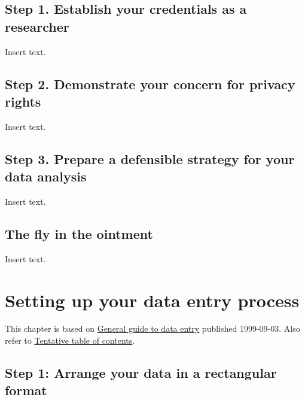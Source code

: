 \documentclass[
  letterpaper,
  DIV=11,
  numbers=noendperiod]{scrreprt}
\begin{document}
\hypertarget{step-1.-establish-your-credentials-as-a-researcher}{%
\section{Step 1. Establish your credentials as a
researcher}\label{step-1.-establish-your-credentials-as-a-researcher}}

Insert text.

\hypertarget{step-2.-demonstrate-your-concern-for-privacy-rights}{%
\section{Step 2. Demonstrate your concern for privacy
rights}\label{step-2.-demonstrate-your-concern-for-privacy-rights}}

Insert text.

\hypertarget{step-3.-prepare-a-defensible-strategy-for-your-data-analysis}{%
\section{Step 3. Prepare a defensible strategy for your data
analysis}\label{step-3.-prepare-a-defensible-strategy-for-your-data-analysis}}

Insert text.

\hypertarget{the-fly-in-the-ointment-5}{%
\section{The fly in the ointment}\label{the-fly-in-the-ointment-5}}

Insert text.


\hypertarget{setting-up-your-data-entry-process}{%
\chapter{Setting up your data entry
process}\label{setting-up-your-data-entry-process}}

This chapter is based on
\href{http://www.pmean.com/99/entry.html}{General guide to data entry}
published 1999-09-03. Also refer to
\href{http://www.pmean.com/10/Contents.html}{Tentative table of
contents}.

\hypertarget{step-1-arrange-your-data-in-a-rectangular-format}{%
\section{Step 1: Arrange your data in a rectangular
format}\label{step-1-arrange-your-data-in-a-rectangular-format}}
\end{document}

